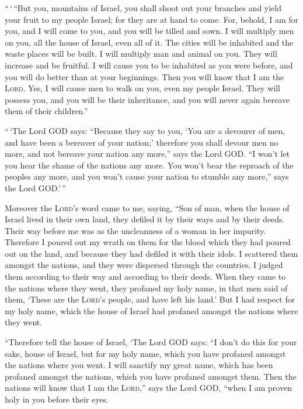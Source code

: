  ``\,`\,``But you, mountains of Israel, you shall shoot
out your branches and yield your fruit to my people Israel; for they are
at hand to come.  For, behold, I am for you, and I will
come to you, and you will be tilled and sown.  I will
multiply men on you, all the house of Israel, even all of it. The cities
will be inhabited and the waste places will be built.  I
will multiply man and animal on you. They will increase and be fruitful.
I will cause you to be inhabited as you were before, and you will do
better than at your beginnings. Then you will know that I am the
\textsc{Lord}.  Yes, I will cause men to walk on you,
even my people Israel. They will possess you, and you will be their
inheritance, and you will never again bereave them of their children.''

 ``\,`The Lord GOD says: ``Because they say to you, `You
are a devourer of men, and have been a bereaver of your nation;'
 therefore you shall devour men no more, and not bereave
your nation any more,'' says the Lord GOD.  ``I won't let
you hear the shame of the nations any more. You won't bear the reproach
of the peoples any more, and you won't cause your nation to stumble any
more,'' says the Lord GOD.'\,''

 Moreover the \textsc{Lord}'s word came to me, saying,
 ``Son of man, when the house of Israel lived in their
own land, they defiled it by their ways and by their deeds. Their way
before me was as the uncleanness of a woman in her impurity.
 Therefore I poured out my wrath on them for the blood
which they had poured out on the land, and because they had defiled it
with their idols.  I scattered them amongst the nations,
and they were dispersed through the countries. I judged them according
to their way and according to their deeds.  When they
came to the nations where they went, they profaned my holy name, in that
men said of them, `These are the \textsc{Lord}'s people, and have left
his land.'  But I had respect for my holy name, which the
house of Israel had profaned amongst the nations where they went.

 ``Therefore tell the house of Israel, `The Lord GOD
says: ``I don't do this for your sake, house of Israel, but for my holy
name, which you have profaned amongst the nations where you went.
 I will sanctify my great name, which has been profaned
amongst the nations, which you have profaned amongst them. Then the
nations will know that I am the \textsc{Lord},'' says the Lord GOD,
``when I am proven holy in you before their eyes.

